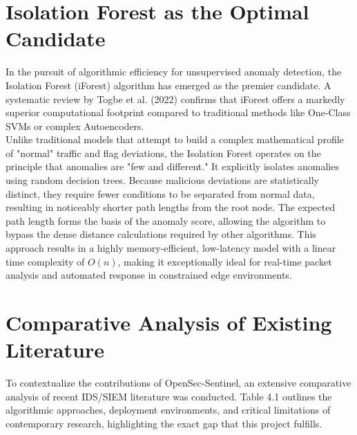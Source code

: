 \documentclass[12pt, a4paper]{report}
\begin{document}
	\section*{Isolation Forest as the Optimal Candidate}
	In the pursuit of algorithmic efficiency for unsupervised anomaly detection, the Isolation Forest (iForest) algorithm has emerged as the premier candidate. A systematic review by Togbe et al. (2022) confirms that iForest offers a markedly superior computational footprint compared to traditional methods like One-Class SVMs or complex Autoencoders. \\
	
	Unlike traditional models that attempt to build a complex mathematical profile of "normal" traffic and flag deviations, the Isolation Forest operates on the principle that anomalies are "few and different." It explicitly isolates anomalies using random decision trees. Because malicious deviations are statistically distinct, they require fewer conditions to be separated from normal data, resulting in noticeably shorter path lengths from the root node. The expected path length forms the basis of the anomaly score, allowing the algorithm to bypass the dense distance calculations required by other algorithms. This approach results in a highly memory-efficient, low-latency model with a linear time complexity of $O(n)$, making it exceptionally ideal for real-time packet analysis and automated response in constrained edge environments.
	
	\section{Comparative Analysis of Existing Literature}
	To contextualize the contributions of OpenSec-Sentinel, an extensive comparative analysis of recent IDS/SIEM literature was conducted. Table 4.1 outlines the algorithmic approaches, deployment environments, and critical limitations of contemporary research, highlighting the exact gap that this project fulfills.
	
\end{document}
